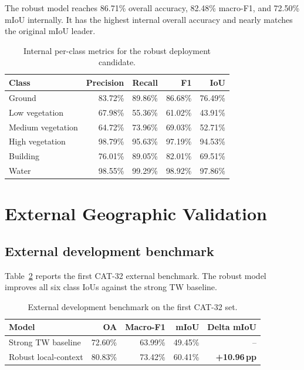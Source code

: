 \documentclass[11pt,a4paper]{article}
\newcommand{\pp}{\,pp}
\newcommand{\good}[1]{\textcolor{evogreen}{\textbf{#1}}}
\begin{document}
The robust model reaches 86.71\% overall accuracy, 82.48\% macro-F1, and 72.50\% mIoU internally. It has the highest internal overall accuracy and nearly matches the original mIoU leader.

\begin{table}[ht]
\centering
\caption{Internal per-class metrics for the robust deployment candidate.}
\label{tab:robust-internal}
\begin{tabular}{lrrrr}
\toprule
Class & Precision & Recall & F1 & IoU \\
\midrule
Ground & 83.72\% & 89.86\% & 86.68\% & 76.49\% \\
Low vegetation & 67.98\% & 55.36\% & 61.02\% & 43.91\% \\
Medium vegetation & 64.72\% & 73.96\% & 69.03\% & 52.71\% \\
High vegetation & 98.79\% & 95.63\% & 97.19\% & 94.53\% \\
Building & 76.01\% & 89.05\% & 82.01\% & 69.51\% \\
Water & 98.55\% & 99.29\% & 98.92\% & 97.86\% \\
\bottomrule
\end{tabular}
\end{table}

\section{External Geographic Validation}

\subsection{External development benchmark}

Table~\ref{tab:cat32-dev} reports the first CAT-32 external benchmark. The robust model improves all six class IoUs against the strong TW baseline.

\begin{table}[ht]
\centering
\caption{External development benchmark on the first CAT-32 set.}
\label{tab:cat32-dev}
\begin{tabular}{lrrrr}
\toprule
Model & OA & Macro-F1 & mIoU & Delta mIoU \\
\midrule
Strong TW baseline & 72.60\% & 63.99\% & 49.45\% & -- \\
Robust local-context & 80.83\% & 73.42\% & 60.41\% & \good{+10.96\pp} \\
\bottomrule
\end{tabular}
\end{table}
\end{document}
